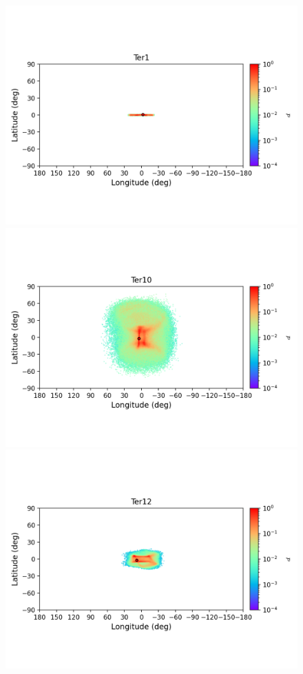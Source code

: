         \begin{figure}
        \includegraphics[clip=true, trim = 0mm 20mm 0mm 10mm, width=1\columnwidth]{images/error_plots_Ter1.png}
        \includegraphics[clip=true, trim = 0mm 20mm 0mm 10mm, width=1\columnwidth]{images/error_plots_Ter10.png}
        \includegraphics[clip=true, trim = 0mm 20mm 0mm 10mm, width=1\columnwidth]{images/error_plots_Ter12.png}

\end{figure}
